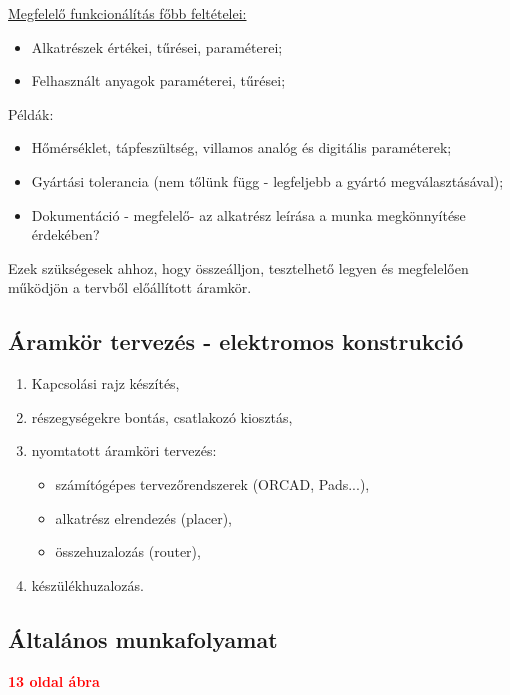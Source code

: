\documentclass[11pt]{article}
\begin{document}
			\underline{Megfelelő funkcionálítás főbb feltételei:}

			\begin{itemize}
				\item Alkatrészek értékei, tűrései, paraméterei;
				\item Felhasznált anyagok paraméterei, tűrései;
			\end{itemize}
			
			Példák:

			\begin{itemize}
				\item Hőmérséklet, tápfeszültség, villamos analóg és digitális paraméterek;
				\item Gyártási tolerancia (nem tőlünk függ - legfeljebb a gyártó megválasztásával);
				\item Dokumentáció - megfelelő- az alkatrész leírása a munka megkönnyítése érdekében?
			\end{itemize}
			
			Ezek szükségesek ahhoz, hogy összeálljon, tesztelhető legyen és megfelelően működjön a tervből előállított áramkör.

		\subsection{Áramkör tervezés - elektromos konstrukció}

			\begin{enumerate}
				\item Kapcsolási rajz készítés,
				\item részegységekre bontás, csatlakozó kiosztás,
				\item nyomtatott áramköri tervezés:
				\begin{itemize}
					\item számítógépes tervezőrendszerek (ORCAD, Pads...),
					\item alkatrész elrendezés (placer),
					\item összehuzalozás (router),
				\end{itemize}
				\item készülékhuzalozás.
			\end{enumerate}

		\subsection{Általános munkafolyamat}

			\textbf{\textcolor{red}{13 oldal ábra}}
\end{document}
